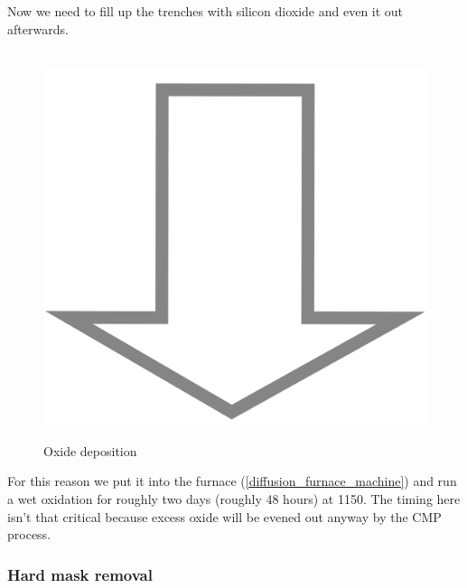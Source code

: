 Now we need to fill up the trenches with silicon dioxide and even it out afterwards.

\begin{figure}[H]
	\centering
	\begin{tikzpicture}[node distance = 3cm, auto, thick,scale=\CrossSectionOnly, every node/.style={transform shape}]
		
	\end{tikzpicture} \\
	\includegraphics[scale=0.01]{down_arrow.png} \\
	\begin{tikzpicture}[node distance = 3cm, auto, thick,scale=\CrossSectionOnly, every node/.style={transform shape}]
		
	\end{tikzpicture}
	\caption{Oxide deposition}
\end{figure}

For this reason we put it into the furnace (\autoref{diffusion_furnace_machine}) and run a wet oxidation for roughly two days (roughly 48 hours) at 1150\degreesC.
The timing here isn't that critical because excess oxide will be evened out anyway by the CMP process.

\subsubsection{Hard mask removal}

